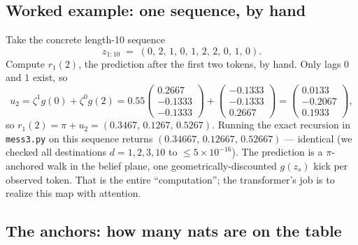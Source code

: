 \documentclass[11pt]{article}
\newcommand{\pzeta}{\zeta}
\newcommand{\gv}[1]{g(#1)}
\newcommand{\rone}{r_1}
\begin{document}
\subsection{Worked example: one sequence, by hand}\label{sec:worked-r1}

Take the concrete length-10 sequence
\[
  z_{1:10} \;=\; (0,\,2,\,1,\,0,\,1,\,2,\,2,\,0,\,1,\,0).
\]
Compute $\rone(2)$, the prediction after the first two tokens, by hand. Only
lags $0$ and $1$ exist, so
\[
  u_2 = \pzeta^{1}\gv{0}+\pzeta^{0}\gv{2}
      = 0.55\!\begin{pmatrix}0.2667\\-0.1333\\-0.1333\end{pmatrix}
      +\begin{pmatrix}-0.1333\\-0.1333\\0.2667\end{pmatrix}
      =\begin{pmatrix}0.0133\\-0.2067\\0.1933\end{pmatrix},
\]
so $\rone(2)=\pi+u_2=(0.3467,\,0.1267,\,0.5267)$. Running the exact recursion
in \texttt{mess3.py} on this sequence returns
$(0.34667,\,0.12667,\,0.52667)$ --- identical (we checked all destinations
$d=1,2,3,10$ to $\le 5\times10^{-16}$). The prediction is a $\pi$-anchored
walk in the belief plane, one geometrically-discounted $\gv{z_s}$ kick per
observed token. That is the entire ``computation''; the transformer's job is
to realize this map with attention.

\subsection{The anchors: how many nats are on the table}\label{sec:anchors}
\end{document}
